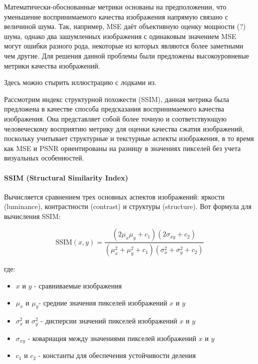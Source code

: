 Математически-обоснованные метрики основаны на предположении, что уменьшение
воспринимаемого качества изображения напрямую связано с величиной шума. Так,
например, MSE даёт объективную оценку мощности (?) шума, однако два зашумленных
изображения с одинаковым значением MSE могут ошибки разного рода, некоторые из
которых являются более заметными чем другие. Для решения данной проблемы были
предложены высокоуровневые метрики качества изображений.

Здесь можно стырить иллюстрацию с лодками из\cite{SSIMArticle}.


Рассмотрим индекс структурной похожести (SSIM), данная метрика была предложена в
качестве способа предсказания воспринимаемого качества изображения. Она
представляет собой более точную и соответствующую человеческому восприятию
метрику для оценки качества сжатия изображений, поскольку учитывает структурные
и текстурные аспекты изображения, в то время как MSE и PSNR ориентированы на
разницу в значениях пикселей без учета визуальных особенностей.


\paragraph{SSIM (Structural Similarity Index)}

Вычисляется сравнением трех основных аспектов изображений: яркости (luminance),
контрастности (contrast) и структуры (structure). Вот формула для вычисления
SSIM:

\begin{equation} \label{eq:img_ssim}
    \text{SSIM}\left(x, y\right) = \frac{
        \left(2\mu_{x}\mu_{y} + c_{1}\right)\left(2\sigma_{xy} + c_{2}\right)
    }{
        \left(\mu_{x}^{2} + \mu_{y}^2 + c_{1}\right)\left(\sigma_{x}^{2} + \sigma_{y}^{2} + c_{2}\right)
    }
\end{equation}

\noindent где:

\begin{itemize}
    \item $x$ и $y$ - сравниваемые изображения
    \item $\mu_{x}$ и $\mu_{y}$​ - средние значения пикселей изображений $x$ и $y$
    \item $\sigma_{x}^{2}$ и $\sigma_{y}^{2}$ - дисперсии значений пикселей изображений $x$ и $y$
    \item $\sigma_{xy}$ - ковариация между значениями пикселей изображений $x$ и $y$
    \item $c_{1}$ и $c_{2}$ - константы для обеспечения устойчивости деления
\end{itemize}


